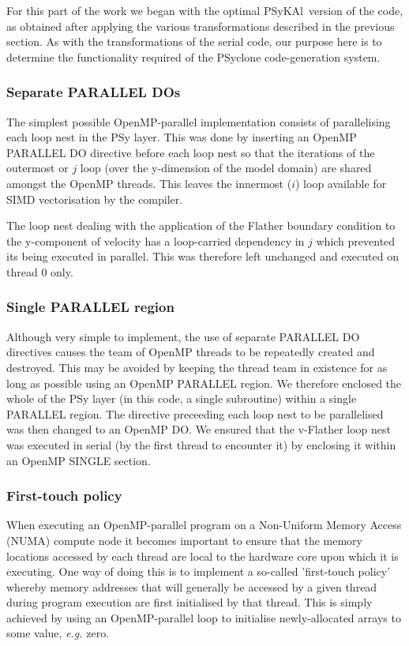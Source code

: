 \documentclass[journal]{IEEEtran}
\newcommand{\psykal}{{PS}y{KA}l\ }
\begin{document}
For this part of the work we began with the optimal \psykal version of
the code, as obtained after applying the various transformations
described in the previous section. As with the transformations of the
serial code, our purpose here is to determine the functionality
required of the PSyclone code-generation system.

\subsubsection{Separate PARALLEL DOs}
\label{sec_sep_dos}

The simplest possible OpenMP-parallel implementation consists of
parallelising each loop nest in the PSy layer. This was done by
inserting an OpenMP PARALLEL DO directive before each loop nest so
that the iterations of the outermost or $j$ loop (over the y-dimension
of the model domain) are shared amongst the OpenMP threads. This
leaves the innermost ($i$) loop available for SIMD vectorisation by
the compiler.

The loop nest dealing with the application of the Flather boundary
condition to the y-component of velocity has a loop-carried dependency
in $j$ which prevented its being executed in parallel. This was
therefore left unchanged and executed on thread 0 only.

\subsubsection{Single PARALLEL region}
\label{sec_single_parallel}

Although very simple to implement, the use of separate PARALLEL DO
directives causes the team of OpenMP threads to be repeatedly created
and destroyed. This may be avoided by keeping the thread team in
existence for as long as possible using an OpenMP PARALLEL region.  We
therefore enclosed the whole of the PSy layer (in this code, a single
subroutine) within a single PARALLEL region. The directive preceeding
each loop nest to be parallelised was then changed to an OpenMP DO. We
ensured that the v-Flather loop nest was executed in serial (by the
first thread to encounter it) by enclosing it within an OpenMP SINGLE
section.

\subsubsection{First-touch policy}
\label{sec_1sttouch}

When executing an OpenMP-parallel program on a Non-Uniform Memory
Access (NUMA) compute node it becomes important to ensure that the
memory locations accessed by each thread are local to the hardware
core upon which it is executing. One way of doing this is to implement
a so-called 'first-touch policy' whereby memory addresses that will
generally be accessed by a given thread during program execution are
first initialised by that thread. This is simply achieved by using an
OpenMP-parallel loop to initialise newly-allocated arrays to some
value, {\it e.g.} zero.
\end{document}
